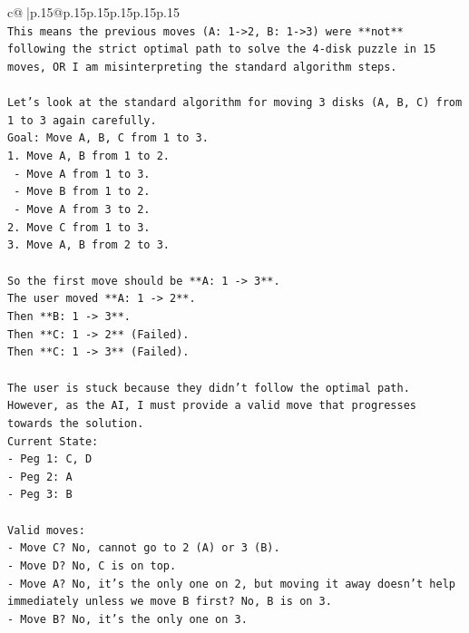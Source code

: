 \documentclass{article}
\begin{document}
{\begin{supertabular}{c@{$\;$}|p{.15\linewidth}@{}p{.15\linewidth}p{.15\linewidth}p{.15\linewidth}p{.15\linewidth}p{.15\linewidth}}
{{{\\ 
\texttt{This means the previous moves (A: 1{-}>2, B: 1{-}>3) were **not** following the strict optimal path to solve the 4{-}disk puzzle in 15 moves, OR I am misinterpreting the standard algorithm steps.} \\
\\ 
\texttt{Let's look at the standard algorithm for moving 3 disks (A, B, C) from 1 to 3 again carefully.} \\
\texttt{Goal: Move A, B, C from 1 to 3.} \\
\texttt{1. Move A, B from 1 to 2.} \\
\texttt{   {-} Move A from 1 to 3.} \\
\texttt{   {-} Move B from 1 to 2.} \\
\texttt{   {-} Move A from 3 to 2.} \\
\texttt{2. Move C from 1 to 3.} \\
\texttt{3. Move A, B from 2 to 3.} \\
\\ 
\texttt{So the first move should be **A: 1 {-}> 3**.} \\
\texttt{The user moved **A: 1 {-}> 2**.} \\
\texttt{Then **B: 1 {-}> 3**.} \\
\texttt{Then **C: 1 {-}> 2** (Failed).} \\
\texttt{Then **C: 1 {-}> 3** (Failed).} \\
\\ 
\texttt{The user is stuck because they didn't follow the optimal path. However, as the AI, I must provide a valid move that progresses towards the solution.} \\
\texttt{Current State:} \\
\texttt{{-} Peg 1: C, D} \\
\texttt{{-} Peg 2: A} \\
\texttt{{-} Peg 3: B} \\
\\ 
\texttt{Valid moves:} \\
\texttt{{-} Move C? No, cannot go to 2 (A) or 3 (B).} \\
\texttt{{-} Move D? No, C is on top.} \\
\texttt{{-} Move A? No, it's the only one on 2, but moving it away doesn't help immediately unless we move B first? No, B is on 3.} \\
\texttt{{-} Move B? No, it's the only one on 3.} \\
\\ 
}}}
\end{supertabular}}
\end{document}
